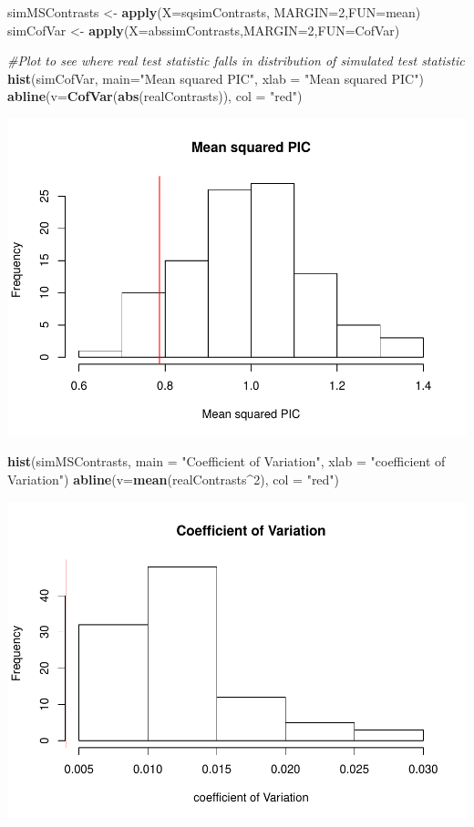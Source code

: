 \documentclass[]{article}
\newenvironment{Shaded}{\begin{snugshade}}{\end{snugshade}}
\newcommand{\KeywordTok}[1]{\textcolor[rgb]{0.13,0.29,0.53}{\textbf{#1}}}
\newcommand{\DataTypeTok}[1]{\textcolor[rgb]{0.13,0.29,0.53}{#1}}
\newcommand{\DecValTok}[1]{\textcolor[rgb]{0.00,0.00,0.81}{#1}}
\newcommand{\StringTok}[1]{\textcolor[rgb]{0.31,0.60,0.02}{#1}}
\newcommand{\CommentTok}[1]{\textcolor[rgb]{0.56,0.35,0.01}{\textit{#1}}}
\newcommand{\OperatorTok}[1]{\textcolor[rgb]{0.81,0.36,0.00}{\textbf{#1}}}
\newcommand{\NormalTok}[1]{#1}
\begin{document}
\begin{Shaded}
\begin{Highlighting}[]
\NormalTok{simMSContrasts <-}\StringTok{ }\KeywordTok{apply}\NormalTok{(}\DataTypeTok{X=}\NormalTok{sqsimContrasts, }\DataTypeTok{MARGIN=}\DecValTok{2}\NormalTok{,}\DataTypeTok{FUN=}\NormalTok{mean)}
\NormalTok{simCofVar <-}\StringTok{ }\KeywordTok{apply}\NormalTok{(}\DataTypeTok{X=}\NormalTok{abssimContrasts,}\DataTypeTok{MARGIN=}\DecValTok{2}\NormalTok{,}\DataTypeTok{FUN=}\NormalTok{CofVar)}

\CommentTok{#Plot to see where real test statistic falls in distribution of simulated test statistic}
\KeywordTok{hist}\NormalTok{(simCofVar, }\DataTypeTok{main=}\StringTok{"Mean squared PIC"}\NormalTok{, }\DataTypeTok{xlab =} \StringTok{"Mean squared PIC"}\NormalTok{)}
\KeywordTok{abline}\NormalTok{(}\DataTypeTok{v=}\KeywordTok{CofVar}\NormalTok{(}\KeywordTok{abs}\NormalTok{(realContrasts)), }\DataTypeTok{col =} \StringTok{"red"}\NormalTok{)}
\end{Highlighting}
\end{Shaded}

\includegraphics[width=0.5\linewidth]{module_08_files/figure-latex/unnamed-chunk-24-1}

\begin{Shaded}
\begin{Highlighting}[]
\KeywordTok{hist}\NormalTok{(simMSContrasts, }\DataTypeTok{main =} \StringTok{"Coefficient of Variation"}\NormalTok{, }\DataTypeTok{xlab =} \StringTok{"coefficient of Variation"}\NormalTok{)}
\KeywordTok{abline}\NormalTok{(}\DataTypeTok{v=}\KeywordTok{mean}\NormalTok{(realContrasts}\OperatorTok{^}\DecValTok{2}\NormalTok{), }\DataTypeTok{col =} \StringTok{"red"}\NormalTok{)}
\end{Highlighting}
\end{Shaded}

\includegraphics[width=0.5\linewidth]{module_08_files/figure-latex/unnamed-chunk-24-2}
\end{document}
